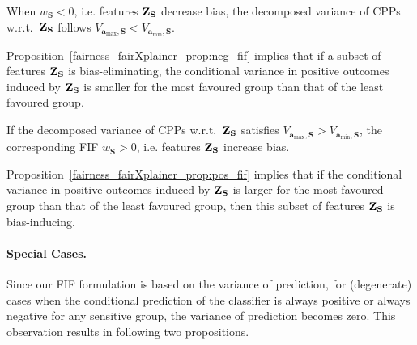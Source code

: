 \begin{proposition}\label{fairness_fairXplainer_prop:neg_fif}
	When $ w_{\mathbf{S}} < 0 $, i.e. features $ \mathbf{Z}_{\mathbf{S}} $ decrease bias, the decomposed variance of CPPs w.r.t.\ $ \mathbf{Z}_{\mathbf{S}} $ follows $ V_{\mathbf{a}_{\max}, \mathbf{S}} < V_{\mathbf{a}_{\min}, \mathbf{S}}  $.
\end{proposition}
Proposition~\ref{fairness_fairXplainer_prop:neg_fif} implies that if a subset of features $ \mathbf{Z}_{\mathbf{S}} $ is bias-eliminating, the conditional variance in positive outcomes induced by $ \mathbf{Z}_{\mathbf{S}} $ is smaller for the most favoured group than that of the least favoured group.
\begin{proposition}\label{fairness_fairXplainer_prop:pos_fif}
{If the decomposed variance of CPPs w.r.t.\ $ \mathbf{Z}_{\mathbf{S}} $ satisfies $ V_{\mathbf{a}_{\max}, \mathbf{S}} > {V_{\mathbf{a}_{\min}, \mathbf{S}}} $, the corresponding FIF $ w_{\mathbf{S}} > 0  $, i.e. features $ \mathbf{Z}_{\mathbf{S}} $ increase bias.}
\end{proposition}
Proposition~\ref{fairness_fairXplainer_prop:pos_fif} implies that if the conditional variance in positive outcomes induced by $ \mathbf{Z}_{\mathbf{S}} $ is larger for the most favoured group than that of the least favoured group, then this subset of features $ \mathbf{Z}_{\mathbf{S}} $ is bias-inducing.

\paragraph{Special Cases.} Since our FIF formulation is based on the variance of prediction, for (degenerate) cases when the conditional prediction of the classifier is always positive or always negative for any sensitive group, the variance of prediction becomes zero. This observation results in following two propositions.

